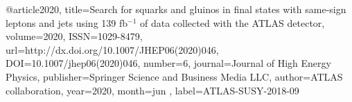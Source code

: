 @article{2020, 
    title={Search for squarks and gluinos in final states with same-sign leptons and jets using 139 fb$^{−1}$ of data collected with the ATLAS detector}, 
    volume={2020}, 
    ISSN={1029-8479}, 
    url={http://dx.doi.org/10.1007/JHEP06(2020)046}, 
    DOI={10.1007/jhep06(2020)046}, 
    number={6}, 
    journal={Journal of High Energy Physics}, 
    publisher={Springer Science and Business Media LLC}, 
    author={ATLAS collaboration}, 
    year={2020}, 
    month=jun ,
    label={ATLAS-SUSY-2018-09}
}

